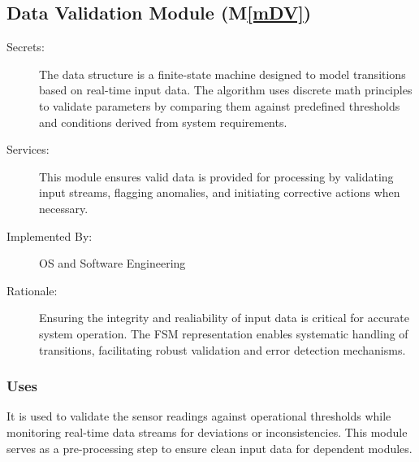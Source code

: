 \documentclass[12pt, titlepage]{article}
\newcommand{\mref}[1]{M\ref{#1}}
\begin{document}
\subsection{Data Validation Module (\mref{mDV})}
\begin{description}
  \item[Secrets:] The data structure is a finite-state machine designed to model transitions based on real-time 
  input data. The algorithm uses discrete math principles to validate parameters by comparing them against predefined
  thresholds and conditions derived from system requirements.
  \item[Services:] This module ensures valid data is provided for processing by validating input streams, flagging
  anomalies, and initiating corrective actions when necessary.
  \item[Implemented By:] OS and Software Engineering
  \item[Rationale:] Ensuring the integrity and realiability of input data is critical for accurate system operation.
  The FSM representation enables systematic handling of transitions, facilitating robust validation and error 
  detection mechanisms.
\end{description}

\subsubsection{Uses}
It is used to validate the sensor readings against operational thresholds while monitoring real-time 
data streams for deviations or inconsistencies. This module serves as a pre-processing step to ensure 
clean input data  for dependent modules.
\end{document}

